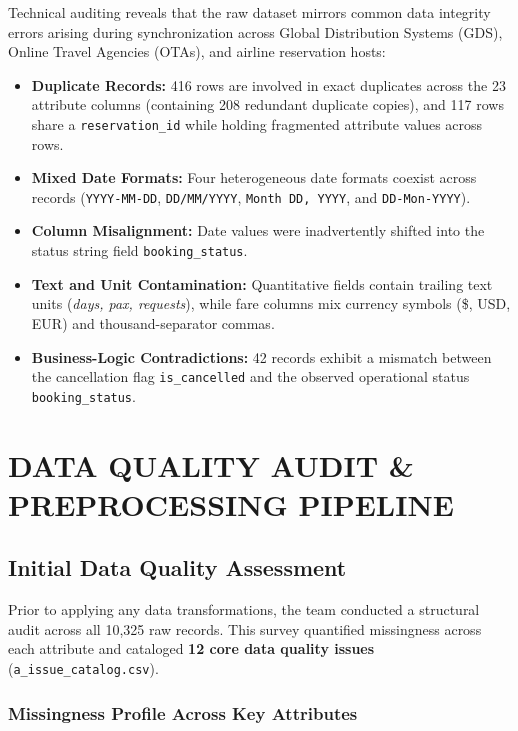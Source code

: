 \documentclass[12pt, a4paper]{report}
\newcommand{\code}[1]{\texttt{\small\color{DarkSlate}#1}}
\begin{document}
Technical auditing reveals that the raw dataset mirrors common data integrity errors arising during synchronization across Global Distribution Systems (GDS), Online Travel Agencies (OTAs), and airline reservation hosts:
\begin{itemize}
  \item \textbf{Duplicate Records:} 416 rows are involved in exact duplicates across the 23 attribute columns (containing 208 redundant duplicate copies), and 117 rows share a \code{reservation\_id} while holding fragmented attribute values across rows.
  \item \textbf{Mixed Date Formats:} Four heterogeneous date formats coexist across records (\code{YYYY-MM-DD}, \code{DD/MM/YYYY}, \code{Month DD, YYYY}, and \code{DD-Mon-YYYY}).
  \item \textbf{Column Misalignment:} Date values were inadvertently shifted into the status string field \code{booking\_status}.
  \item \textbf{Text and Unit Contamination:} Quantitative fields contain trailing text units (\textit{days, pax, requests}), while fare columns mix currency symbols (\$, USD, EUR) and thousand-separator commas.
  \item \textbf{Business-Logic Contradictions:} 42 records exhibit a mismatch between the cancellation flag \code{is\_cancelled} and the observed operational status \code{booking\_status}.
\end{itemize}

\chapter{DATA QUALITY AUDIT \& PREPROCESSING PIPELINE}

\section{Initial Data Quality Assessment}

Prior to applying any data transformations, the team conducted a structural audit across all 10,325 raw records. This survey quantified missingness across each attribute and cataloged \textbf{12 core data quality issues} (\code{a\_issue\_catalog.csv}).

\subsection{Missingness Profile Across Key Attributes}
\end{document}

